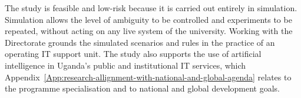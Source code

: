 The study is feasible and low-risk because it is carried out entirely in simulation. Simulation allows the level of ambiguity to be controlled and experiments to be repeated, without acting on any live system of the university. Working with the Directorate grounds the simulated scenarios and rules in the practice of an operating IT support unit. The study also supports the use of artificial intelligence in Uganda's public and institutional IT services, which Appendix~\ref{App:research-allignment-with-national-and-global-agenda} relates to the programme specialisation and to national and global development goals.

